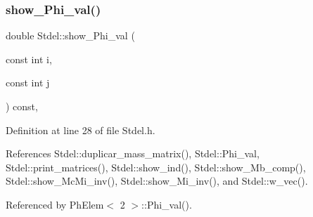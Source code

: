 \subsubsection{\texorpdfstring{show\+\_\+\+Phi\+\_\+val()}{show\_Phi\_val()}}
{\footnotesize\ttfamily double Stdel\+::show\+\_\+\+Phi\+\_\+val (\begin{DoxyParamCaption}\item[{const int}]{i,  }\item[{const int}]{j }\end{DoxyParamCaption}) const\hspace{0.3cm}{\ttfamily [inline]}, {\ttfamily [inherited]}}



Definition at line 28 of file Stdel.\+h.



References Stdel\+::duplicar\+\_\+mass\+\_\+matrix(), Stdel\+::\+Phi\+\_\+val, Stdel\+::print\+\_\+matrices(), Stdel\+::show\+\_\+ind(), Stdel\+::show\+\_\+\+Mb\+\_\+comp(), Stdel\+::show\+\_\+\+Mc\+Mi\+\_\+inv(), Stdel\+::show\+\_\+\+Mi\+\_\+inv(), and Stdel\+::w\+\_\+vec().



Referenced by Ph\+Elem$<$ 2 $>$\+::\+Phi\+\_\+val().

